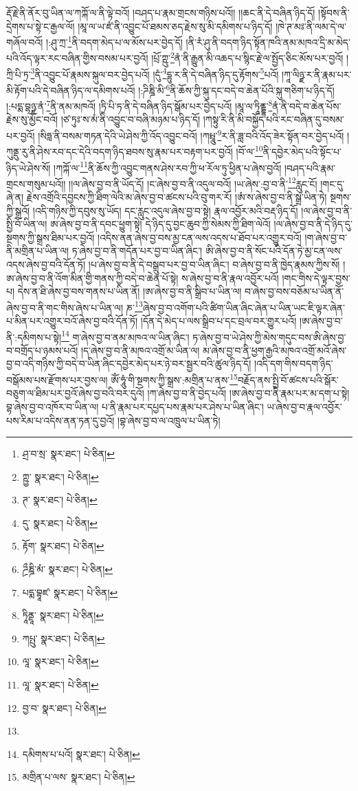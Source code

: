 རྡོ་རྗེ་ནི་ནོར་བུ་ཡིན་ལ་ཀཀྐོ་ལ་ནི་ལྟེ་བའོ། །བཤད་པ་རྣམ་གྲངས་གཉིས་པའོ།། །།ཆང་ནི་དེ་བཞིན་ཉིད་དོ། །སྟོབས་ནི་དྲེགས་པ་སྟེ་ང་རྒྱལ་ལོ། །མཱ་ལ་ཡ་ཛཾ་ནི་འབྱུང་པོ་ཐམས་ཅད་རྗེས་སུ་མི་དམིགས་པ་ཉིད་དོ། །ཁེ་ཊ་མཿ་ནི་ལམ་དེ་ལ་གཞོལ་བའོ། །:ཤུ་ཀྲ་\footnote{ཤྲ་བ་སྲ་  སྣར་ཐང་།  པེ་ཅིན། }ནི་བདག་མེད་པ་ལ་མོས་པར་བྱེད་དོ། །ནི་རཾ་ཤུ་ནི་བདག་ཉིད་སྟོན་ཁའི་ནམ་མཁའ་དྲི་མ་མེད་པའི་འོད་ལྟར་རང་བཞིན་གྱིས་བསམ་པར་བྱའོ། །པྲོ་ཀྵུ་\footnote{ཀྵྱ་  སྣར་ཐང་།  པེ་ཅིན། }ནཾ་ནི་རྒྱུན་མི་འཆད་པ་སྙིང་རྗེ་ལ་སྤྱོད་ཅིང་མོས་པར་བྱའོ། །ཀྲི་པི་ཏྲ་\footnote{ཊ་  སྣར་ཐང་།  པེ་ཅིན། }ནི་འབྱུང་པོ་རྣམས་སྐུལ་བར་བྱེད་པའོ། །དུཾ་\footnote{དུ་  སྣར་ཐང་།  པེ་ཅིན། }དྷུ་ར་ནི་དེ་བཞིན་ཉིད་དུ་རྟོགས་\footnote{རྟོག་  སྣར་ཐང་།  པེ་ཅིན། }པའོ། །ཀཱ་ལིཉྫ་ར་ནི་རྣམ་པར་མི་རྟོག་པའི་དེ་བཞིན་ཉིད་ལ་དམིགས་པའོ། །:ཌིཎྜི་མི་\footnote{ཌྲྀཎྜི་མཾ་  སྣར་ཐང་།  པེ་ཅིན། }ནི་ཆོས་ཀྱི་སྐུ་དང་བདེ་བ་ཆེན་པོའི་སྐུ་གཅིག་པ་ཉིད་དོ། །:པདྨ་བྷཉྫ་ནཾ་\footnote{པདྨ་བྷཱཛ་  སྣར་ཐང་།  པེ་ཅིན། }ནི་ནམ་མཁའོ། །ཏྲི་པི་ཏ་ནི་དེ་བཞིན་ཉིད་སྒོམ་པར་བྱེད་པའོ། །མཱ་ལ་ཏཱིནྡྷ་\footnote{ཏཱིནྡཱ་  སྣར་ཐང་།  པེ་ཅིན། }ནཾ་ནི་བདེ་བ་ཆེན་པོས་རྗེས་སུ་མྱོང་བའོ། །ཙ་ཏུཿ་ས་མཾ་ནི་འབྱུང་བ་བཞི་མཉམ་པ་ཉིད་དོ། །ཀསྟུ་རི་ནི་མི་བསྐྱོད་པའི་རང་བཞིན་དུ་བསམ་པར་བྱའོ། །སིཧླ་ནི་བསམ་གཏན་དེའི་ཡེ་ཤེས་ཀྱི་འོད་འབྱུང་བའོ། །ཀཔྤཱུ་\footnote{ཀཔྤུ་  སྣར་ཐང་།  པེ་ཅིན། }ར་ནི་ཟླ་བའི་འོད་ཟེར་སྟོན་བར་བྱེད་པའོ། །ཀུནྡུ་རུ་ནི་ཤེས་རབ་དང་དེའི་བདག་ཉིད་ཐབས་སུ་རྣམ་པར་བརྟག་པར་བྱའོ། །བོ་ལ་\footnote{ལཱ་  སྣར་ཐང་།  པེ་ཅིན། }ནི་དབྱེར་མེད་པའི་སྟོང་པ་ཉིད་ཡེ་ཤེས་སོ། །ཀཀྐོ་ལ་\footnote{ལཱ་  སྣར་ཐང་།  པེ་ཅིན། }ནི་ཆོས་ཀྱི་འབྱུང་གནས་ཤེས་རབ་ཀྱི་ཕ་རོལ་ཏུ་ཕྱིན་པ་ཞེས་བྱའོ། །བཤད་པའི་རྣམ་གྲངས་གསུམ་པའོ།། །།ལ་ཞེས་བྱ་བ་ནི་ཡོད་དོ། །ང་ཞེས་བྱ་བ་ནི་འདུལ་བའོ། །ཡ་ཞེས་:བྱ་བ་ནི་\footnote{བྱ་བ་  སྣར་ཐང་།  པེ་ཅིན། }རླུང་ངོ། །གང་དུ་ཞེ་ན། རྗེས་འགྲོའི་དབྱངས་ཀྱི་ཐིག་ལེའི་མ་ཞེས་བྱ་བ་ཚངས་པའི་བུ་གར་རོ། །ཨཾ་ས་ཞེས་བྱ་བ་ནི་སྒྲ་ཡིན་ཏེ། སྔགས་ཀྱི་སྒྲའོ། །འདི་གཉིས་ཀྱི་དབུས་སུ་ཡོད། དང་རླུང་འདུལ་ཞེས་བྱ་བ་སྟེ། རྣལ་འབྱོར་མའི་བརྡ་ཉིད་དོ། །ལ་ཞེས་བྱ་བ་ནི་སྤྱི་བོ་ཡིན་ལ། ཨ་ཞེས་བྱ་བ་ནི་དབང་ཕྱུག་སྟེ། དེ་ཉིད་དུ་བྱང་ཆུབ་ཀྱི་སེམས་ཀྱི་ཐིག་ལེའོ། །ལ་ཞེས་བྱ་བ་ནི་དེ་ཉིད་དུ་སྔགས་ཀྱི་སྒྲས་ཐིམ་པར་བྱའོ། །འདིས་ནན་ཞེས་བྱ་བས་མྱ་ངན་ལས་འདས་པ་ཐོབ་པར་འགྱུར་བའོ། །ག་ཞེས་བྱ་བ་ནི་མགྲིན་པ་ཡིན་ལ། ཏ་ཞེས་བྱ་བ་ནི་གདོན་པར་བྱ་བ་ཡིན་ཞིང་། ཨི་ཞེས་བྱ་བ་ནི་སོང་པའི་དོན་ཏེ་མྱ་ངན་ལས་འདས་ཞེས་བྱ་བའི་དོན་ཏོ། །པ་ཞེས་བྱ་བ་ནི་དེ་བསྒྲུབ་པར་བྱ་བ་ཡིན་ཞིང་། བ་ཞེས་བྱ་བ་ནི་ཁྱེད་རྣམས་ཀྱིས་སོ། །ཨ་ཞེས་བྱ་བ་ནི་འོག་མིན་གྱི་གནས་ཀྱི་བདེ་བ་ཆེན་པོ་སྟེ། ས་ཞེས་བྱ་བ་ནི་རྣལ་འབྱོར་པའོ། །གང་གིས་དེ་ལྟར་བྱས་པ། དེས་ན་ཐི་ཞེས་བྱ་བས་གནས་པ་ཡིན་ནོ། །ཨ་ཞེས་བྱ་བ་ནི་སྒྲིབ་པ་ཡིན་ལ། བ་ཞེས་བྱ་བས་བཅོམ་པ་ཡིན་ནོ་ཞེས་བྱ་བ་ནི་གང་གིས་ཞེས་པ་ཡིན་ལ། ཎ་\footnote{}ཞེས་བྱ་བ་འགོག་པའི་ཚིག་ཡིན་ཞིང་ཞེན་པ་ཡིན་ཡང་ཇི་ལྟར་ཞེན་པ་མིན་པར་འགྱུར་བའོ་ཞེས་བྱ་བའི་དོན་ཏོ། །དོན་དེ་མེད་པ་ལས་སྒྲིབ་པ་དང་བྲལ་བར་གྱུར་པའོ། །ཨ་ཞེས་བྱ་བ་ནི་:དམིགས་པ་སྟེ།\footnote{དམིགས་པ་པའོ།  སྣར་ཐང་།  པེ་ཅིན། } ག་ཞེས་བྱ་བ་ནམ་མཁའ་ལ་ཡིན་ཞིང་། ཏ་ཞེས་བྱ་བ་ཡེ་ཤེས་ཀྱི་མེས་གདུང་བས་ཨི་ཞེས་བྱ་བ་བགྲོད་པ་ཉམས་པའོ། །ད་ཞེས་བྱ་བ་ནི་མཁའ་འགྲོ་མ་ཡིན་ལ། མ་ཞེས་བྱ་བ་ནི་ཕྱག་རྒྱའི་མཁའ་འགྲོ་མའོ་ཞེས་བྱ་བ་འདི་གཉིས་ཀྱི་བདེ་བ་ཡིན་ཞིང་དབྱེར་མེད་པར་ཉེ་བར་སྦྱར་བའི་ཚུལ་ཉིད་དོ། །འདི་དག་གིས་བདག་ཉིད་བསྒོམས་པས་རྫོགས་པར་བྱས་ལ། ཨོཾ་ཧཱུཾ་གི་སྔགས་ཀྱི་སྒྲས་:མགྲིན་པ་ནས་\footnote{མགྲིན་པ་ལས་  སྣར་ཐང་།  པེ་ཅིན། }བརྗོད་ནས་སྤྱི་བོ་ཚངས་པའི་སྒོར་བཅུག་ལ་ཐིམ་པར་བྱའོ་ཞེས་བྱ་བའི་བར་དུའོ། །ཀ་ཞེས་བྱ་བ་ནི་བྱེད་པའོ། །ཨ་ཞེས་བྱ་བ་ནི་རྣམ་པར་མ་དག་པ་སྟེ། བྷ་ཞེས་བྱ་བ་འཁོར་བ་ཡིན་ལ། པ་ནི་རྣམ་པར་དཔྱད་པས་རྣམ་པར་ཤེས་པ་ཡིན་ཞིང་། ཡ་ཞེས་བྱ་བ་རྣལ་འབྱོར་པས་རིམ་པ་འདིས་ནན་ཏན་དུ་བྱའོ། །བྷ་ཞེས་བྱ་བ་ལ་འཁྲུལ་པ་ཡིན་ཏེ། 